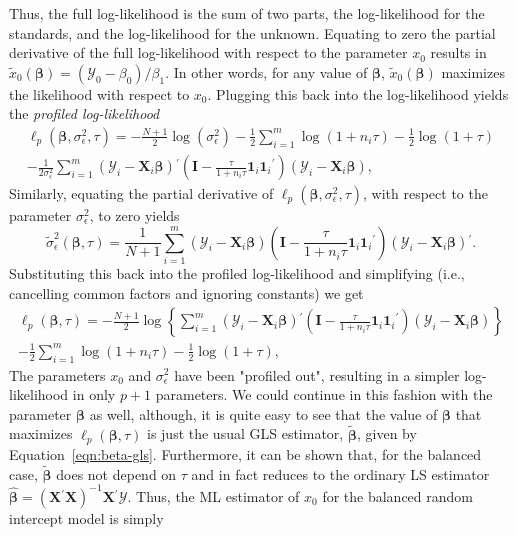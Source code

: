 \documentclass[cmfont,usenames,dvipsnames,leqno]{afit-etd}\usepackage[]{graphicx}\usepackage[]{color}
\newcommand{\trans}{\ensuremath{^\prime}}
\newcommand{\bc}[1]{\ensuremath{\bm{\mathcal{#1}}}}
\newcommand{\mc}[1]{\ensuremath{\mathcal{#1}}}
\newcommand{\wh}[1]{\ensuremath{\widehat{#1}}}
\newcommand{\X}{\ensuremath{\bm{X}}}
\begin{document}
Thus, the full log-likelihood is the sum of two parts, the log-likelihood for the standards, and the log-likelihood for the unknown. Equating to zero the partial derivative of the full log-likelihood with respect to the parameter $x_0$ results in $\widetilde{x}_0\left(\bm{\beta}\right) = \left(\mc{Y}_0 - \beta_0\right)/\beta_1$. In other words, for any value of $\bm{\beta}$, $\widetilde{x}_0\left(\bm{\beta}\right)$ maximizes the likelihood with respect to $x_0$. Plugging this back into the log-likelihood yields the \textit{profiled log-likelihood}
\begin{multline*}
  \mc{\ell}_p\left(\bm{\beta}, \sigma_\epsilon^2, \tau\right) = -\frac{N+1}{2}\log\left(\sigma_\epsilon^2\right) - \frac{1}{2}\sum_{i = 1}^m \log\left(1 + n_i\tau\right) - \frac{1}{2}\log\left(1 + \tau\right) \\ - \frac{1}{2\sigma_\epsilon^2}\sum_{i = 1}^m \left(\bc{Y}_i - \X_i\bm{\beta}\right)\trans\left(\bm{I} - \frac{\tau}{1 + n_i\tau}\bm{1}_i\bm{1}_i\trans\right)\left(\bc{Y}_i - \X_i\bm{\beta}\right),
\end{multline*}
Similarly, equating the partial derivative of $\mc{\ell}_p\left(\bm{\beta}, \sigma_\epsilon^2, \tau\right)$, with respect to the parameter $\sigma_\epsilon^2$, to zero yields 
\begin{equation*}
  \widetilde{\sigma}_\epsilon^2\left(\bm{\beta}, \tau\right) = \frac{1}{N + 1}\sum_{i = 1}^m \left(\bc{Y}_i - \X_i\bm{\beta}\right)\left(\bm{I} - \frac{\tau}{1 + n_i\tau}\bm{1}_i\bm{1}_i\trans\right)\left(\bc{Y}_i - \X_i\bm{\beta}\right)\trans.
\end{equation*}
Substituting this back into the profiled log-likelihood and simplifying (i.e., cancelling common factors and ignoring constants) we get
\begin{multline*}
  \mc{\ell}_p\left(\bm{\beta}, \tau\right) = -\frac{N+1}{2}\log\left\{\sum_{i = 1}^m \left(\bc{Y}_i - \X_i\bm{\beta}\right)\trans\left(\bm{I} - \frac{\tau}{1 + n_i\tau}\bm{1}_i\bm{1}_i\trans\right)\left(\bc{Y}_i - \X_i\bm{\beta}\right)\right\} \\ - \frac{1}{2}\sum_{i = 1}^m \log\left(1 + n_i\tau\right) - \frac{1}{2}\log\left(1 + \tau\right),
\end{multline*}
The parameters $x_0$ and $\sigma_\epsilon^2$ have been "profiled out", resulting in a simpler log-likelihood in only $p + 1$ parameters. We could continue in this fashion with the parameter $\bm{\beta}$ as well, although, it is quite easy to see that the value of $\bm{\beta}$ that maximizes $\mc{\ell}_p\left(\bm{\beta}, \tau\right)$ is just the usual GLS estimator, $\widetilde{\bm{\beta}}$, given by Equation~\eqref{eqn:beta-gls}. Furthermore, it can be shown \citep{demidenko_mixed_2013} that, for the balanced case, $\widetilde{\bm{\beta}}$ does not depend on $\tau$ and in fact reduces to the ordinary LS estimator $\wh{\bm{\beta}} = \left(\X\trans\X\right)^{-1}\X\trans\bc{Y}$. Thus, the ML estimator of $x_0$ for the balanced random intercept model is simply
\end{document}
